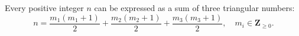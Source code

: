 Every positive integer $n$ can be expressed as a sum of three triangular numbers:
$$
n = \frac{m_1(m_1+1)}{2} + \frac{m_2(m_2+1)}{2} + \frac{m_3(m_3+1)}{2}, \quad m_i \in \mathbf{Z}_{\geq 0}.
$$

